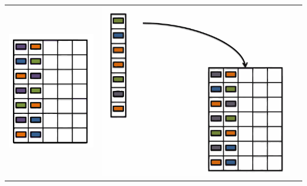 \documentclass{beamer}
\begin{document}
\begin{frame}
	\begin{center}
		\begin{tabular}{ccc}
			\includegraphics*[scale=0.23]{figures/FD1.pdf} &
			\includegraphics*[scale=0.23]{figures/FD2.pdf} 

\end{tabular}
\end{center}
\end{frame}
\end{document}
